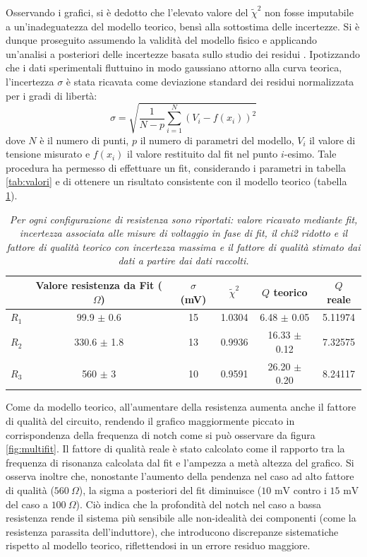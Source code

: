 \documentclass[12pt]{article}
\numberwithin{equation}{section}
\begin{document}
Osservando i grafici, si è dedotto che l'elevato valore del $\widetilde{\chi}^2$ non fosse imputabile a un'inadeguatezza del modello teorico, bensì alla sottostima delle incertezze. Si è dunque proseguito assumendo la validità del modello fisico e applicando un'analisi a posteriori delle incertezze basata sullo studio dei residui \cite{Montgomery}. Ipotizzando che i dati sperimentali fluttuino in modo gaussiano attorno alla curva teorica, l'incertezza $\sigma$ è stata ricavata come deviazione standard dei residui normalizzata per i gradi di libertà:\begin{equation*}\sigma = \sqrt{\frac{1}{N-p}\sum_{i=1}^N(V_i - f(x_i))^2}\end{equation*}dove $N$ è il numero di punti, $p$ il numero di parametri del modello, $V_i$ il valore di tensione misurato e $f(x_i)$ il valore restituito dal fit nel punto $i$-esimo. Tale procedura ha permesso di effettuare un fit, considerando i parametri in tabella \ref{tab:valori} e di ottenere un risultato consistente con il modello teorico (tabella \ref{tab:chi2}).

\begin{table}[H]
\centering
\begin{tabular}{||c | c | c | c | c | c ||} 
 \hline
   & Valore resistenza da Fit ($\Omega$)& $\sigma$ (mV) & $\widetilde{\chi}^2$ & $Q$ teorico & $Q$ reale \\ [0.5ex] 
 \hline\hline
 $R_{1}$ &  99.9 $\pm$ 0.6 & 15  & 1.0304 & 6.48 $\pm$ 0.05 & 5.11974 \\
 \hline
 $R_{2}$ &  330.6 $\pm$ 1.8 & 13 & 0.9936 & 16.33 $\pm$ 0.12 & 7.32575 \\ 
 \hline
 $R_{3}$ & 560 $\pm$ 3 & 10 & 0.9591 & 26.20 $\pm$ 0.20 & 8.24117 \\
 \hline
\end{tabular}
\caption{\textit{Per ogni configurazione di resistenza sono riportati: valore ricavato mediante fit, incertezza associata alle misure di voltaggio in fase di fit, il chi2 ridotto e il fattore di qualità teorico con incertezza massima \cite{Taylor}e il fattore di qualità stimato dai dati a partire dai dati raccolti.}}
\label{tab:chi2}
\end{table}

Come da modello teorico, all'aumentare della resistenza aumenta anche il fattore di qualità del circuito, rendendo il grafico maggiormente piccato in corrispondenza della frequenza di notch come si può osservare da figura \ref{fig:multifit}. Il fattore di qualità reale è stato calcolato come il rapporto tra la frequenza di risonanza calcolata dal fit e l'ampezza a metà altezza del grafico. Si osserva inoltre che, nonostante l'aumento della pendenza nel caso ad alto fattore di qualità ($560\ \Omega$), la sigma a posteriori del fit diminuisce ($10\text{ mV}$ contro i $15\text{ mV}$ del caso a $100\ \Omega$). Ciò indica che la profondità del notch nel caso a bassa resistenza rende il sistema più sensibile alle non-idealità dei componenti (come la resistenza parassita dell'induttore), che introducono discrepanze sistematiche rispetto al modello teorico, riflettendosi in un errore residuo maggiore. 
\end{document}
